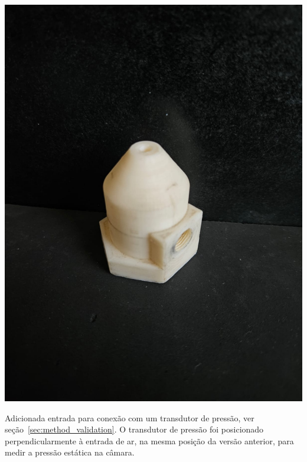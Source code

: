 \begin{minipage}{.49\textwidth}
    \includegraphics[width=\textwidth]{img/app_dev_history/motor3.jpeg}
\end{minipage}
\begin{minipage}{.49\textwidth}
    Adicionada entrada para conexão com um transdutor de pressão, ver seção~\ref{sec:method_validation}. O transdutor de pressão foi posicionado perpendicularmente à entrada de ar, na mesma posição da versão anterior, para medir a pressão estática na câmara.
\end{minipage}

